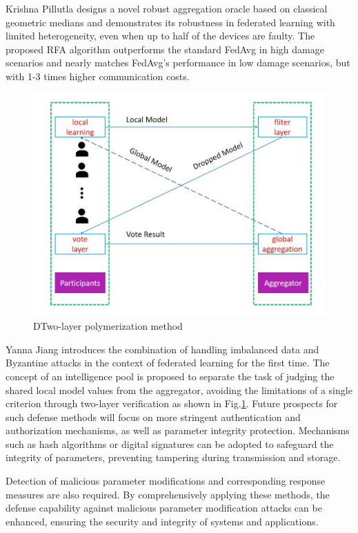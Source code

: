 \documentclass[conference]{IEEEtran}
\begin{document}
Krishna Pillutla \cite{b134} designs a novel robust aggregation oracle based on classical
geometric medians and demonstrates its robustness in federated learning with limited
heterogeneity, even when up to half of the devices are faulty. The proposed RFA algorithm
outperforms the standard FedAvg in high damage scenarios and nearly matches
FedAvg's performance in low damage scenarios, but with 1-3 times higher communication costs.

\begin{figure}[htbp]
    \centerline{\includegraphics[width=0.8\linewidth,height=0.6\linewidth]{picture/vote.jpg}}
    \caption{DTwo-layer polymerization method}
    \label{fig17}
\end{figure}

Yanna Jiang \cite{b124} introduces the combination of handling imbalanced data and Byzantine attacks
in the context of federated learning for the first time. The concept of an intelligence pool
is proposed to separate the task of judging the shared local model values from the aggregator,
avoiding the limitations of a single criterion through two-layer verification as shown in Fig.\ref{fig17}.
Future prospects for such defense methods will focus on more stringent authentication and
authorization mechanisms, as well as parameter integrity protection. Mechanisms such as
hash algorithms or digital signatures can be adopted to safeguard the integrity of
parameters, preventing tampering during transmission and storage.


Detection of
malicious parameter modifications and corresponding response measures are also required.
By comprehensively applying these methods, the defense capability against malicious parameter
modification attacks can be enhanced, ensuring the security and integrity of systems and applications.
\end{document}
